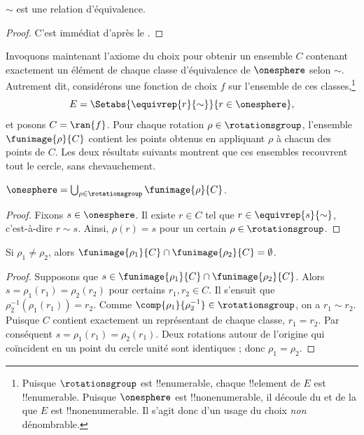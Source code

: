 \documentclass[../../../include/open-logic-section]{subfiles}
\begin{document}
\begin{lem}
$\sim$ est une relation d'équivalence.
\end{lem}

\begin{proof}
C'est immédiat d'après le
.
\end{proof}

Invoquons maintenant l'axiome du
choix pour obtenir un ensemble
$C$ contenant exactement un
élément de chaque classe d'équivalence
de $\onesphere$ selon $\sim$.
Autrement dit, considérons une
fonction de choix $f$ sur
l'ensemble de ces classes,\footnote{
Puisque $\rotationsgroup$ est
!!{enumerable}, chaque !!{element}
de $E$ est !!{enumerable}.
Puisque $\onesphere$ est
!!{nonenumerable}, il découle
du  et de la
que $E$ est !!{nonenumerable}.
Il s'agit donc d'un usage du
choix \emph{non} dénombrable.}
\[
	E = \Setabs{\equivrep{r}{\sim}}
	{r \in \onesphere},
\]
et posons $C = \ran{f}$.
Pour chaque rotation
$\rho \in \rotationsgroup$,
l'ensemble $\funimage{\rho}{C}$
contient les points obtenus
en appliquant $\rho$ à chacun
des points de $C$. Les deux
résultats suivants montrent que
ces ensembles recouvrent tout
le cercle, sans chevauchement.

\begin{lem}
$\onesphere =
\bigcup_{\rho \in \rotationsgroup}
\funimage{\rho}{C}$.
\end{lem}

\begin{proof}
Fixons $s \in \onesphere$.
Il existe $r \in C$ tel que
$r \in \equivrep{s}{\sim}$,
c'est-à-dire $r\sim s$.
Ainsi, $\rho(r)=s$ pour
un certain
$\rho \in \rotationsgroup$.
\end{proof}

\begin{lem}
Si $\rho_1\neq\rho_2$, alors
$\funimage{\rho_1}{C}
\cap\funimage{\rho_2}{C}
=\emptyset$.
\end{lem}

\begin{proof}
Supposons que
$s\in\funimage{\rho_1}{C}
\cap\funimage{\rho_2}{C}$.
Alors
$s=\rho_1(r_1)=\rho_2(r_2)$
pour certains $r_1,r_2\in C$.
Il s'ensuit que
$\rho_2^{-1}(\rho_1(r_1))=r_2$.
Comme
$\comp{\rho_1}{\rho_2^{-1}}
\in\rotationsgroup$,
on a $r_1\sim r_2$.
Puisque $C$ contient exactement
un représentant de chaque classe,
$r_1=r_2$. Par conséquent
$s=\rho_1(r_1)=\rho_2(r_1)$.
Deux rotations autour de l'origine
qui coïncident en un point du
cercle unité sont identiques ;
donc $\rho_1=\rho_2$.
\end{proof}
\end{document}
